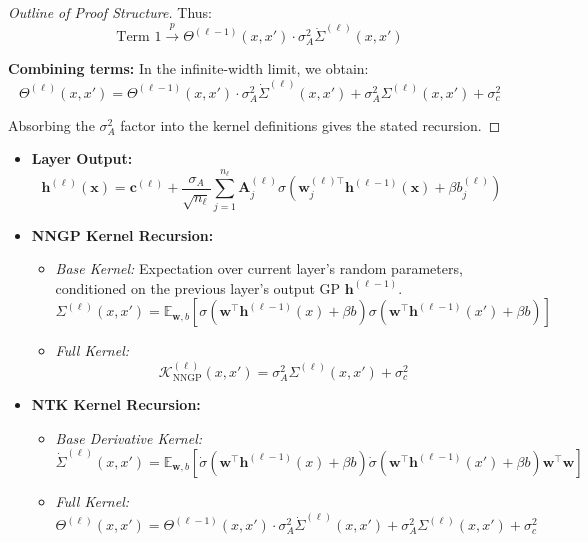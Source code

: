 \documentclass[a4paper]{article}
\theoremstyle{plain}
\theoremstyle{definition}
\theoremstyle{remark}
\begin{document}
\begin{proof}[Outline of Proof Structure]
Thus:
\begin{equation}
\text{Term 1} \xrightarrow{p} \Theta^{(\ell-1)}(x, x') \cdot \sigma_A^2 \dot{\Sigma}^{(\ell)}(x, x')
\end{equation}

\textbf{Combining terms:} In the infinite-width limit, we obtain:
\begin{equation}
\Theta^{(\ell)}(x, x') = \Theta^{(\ell-1)}(x, x') \cdot \sigma_A^2 \dot{\Sigma}^{(\ell)}(x, x') + \sigma_A^2 \Sigma^{(\ell)}(x, x') + \sigma_c^2
\end{equation}

Absorbing the $\sigma_A^2$ factor into the kernel definitions gives the stated recursion.
\end{proof}



\begin{tcolorbox}[colback=blue!15,colframe=blue!80!black,title={\textbf{Summary of Formulas}},enhanced,drop shadow,boxrule=2pt]
    \begin{itemize}
        \item \textbf{Layer Output:}
        \[ \boxed{\bm{h}^{(\ell)}(\bm{x}) = \bm{c}^{(\ell)} + \frac{\sigma_A}{\sqrt{n_\ell}} \sum_{j=1}^{n_\ell} \bm{A}_j^{(\ell)} \sigma\left(\bm{w}_j^{(\ell)\top} \bm{h}^{(\ell-1)}(\bm{x}) + \beta b_j^{(\ell)}\right)} \]
    
        \item \textbf{NNGP Kernel Recursion:}
        \begin{itemize}
            \item \textit{Base Kernel:} Expectation over current layer's random parameters, conditioned on the previous layer's output GP $\bm{h}^{(\ell-1)}$.
            \[ \boxed{\Sigma^{(\ell)}(x, x') = \mathbb{E}_{\bm{w}, b} \left[ \sigma\left(\bm{w}^\top \bm{h}^{(\ell-1)}(x) + \beta b\right) \sigma\left(\bm{w}^\top \bm{h}^{(\ell-1)}(x') + \beta b\right) \right]} \]
            \item \textit{Full Kernel:}
            \[ \boxed{\mathcal{K}_{\text{NNGP}}^{(\ell)}(x, x') = \sigma_A^2 \Sigma^{(\ell)}(x, x') + \sigma_c^2} \]
        \end{itemize}
    
        \item \textbf{NTK Kernel Recursion:}
        \begin{itemize}
            \item \textit{Base Derivative Kernel:}
            \[ \boxed{\dot{\Sigma}^{(\ell)}(x, x') = \mathbb{E}_{\bm{w}, b} \left[ \dot{\sigma}\left(\bm{w}^\top \bm{h}^{(\ell-1)}(x) + \beta b\right) \dot{\sigma}\left(\bm{w}^\top \bm{h}^{(\ell-1)}(x') + \beta b\right) \bm{w}^\top\bm{w} \right]} \]
            \item \textit{Full Kernel:}
            \[ \boxed{\Theta^{(\ell)}(x, x') = \Theta^{(\ell-1)}(x, x') \cdot \sigma_A^2  \dot{\Sigma}^{(\ell)}(x, x') + \sigma_A^2 \Sigma^{(\ell)}(x, x') + \sigma_c^2} \]
        \end{itemize}
    \end{itemize}
    \end{tcolorbox}
\end{document}
